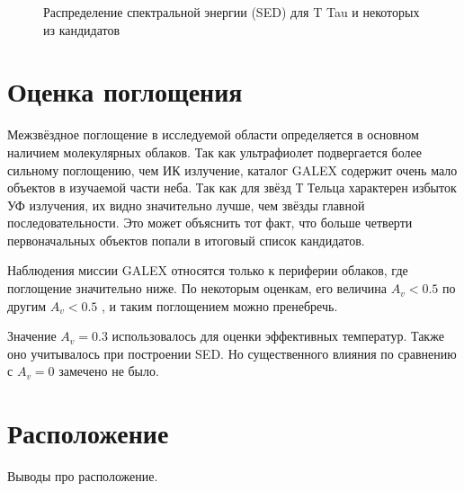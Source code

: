 \begin{figure}[ht]
\begin{minipage}[ht]{0.49\linewidth}
\end{minipage}
\hfill
\begin{minipage}[ht]{0.49\linewidth}
\end{minipage}
\begin{minipage}[ht]{0.49\linewidth}
\end{minipage}
\hfill
\begin{minipage}[ht]{0.49\linewidth}
\end{minipage}
\caption{Распределение спектральной энергии (SED) для T Tau и некоторых из кандидатов}
\label{fig:sed}
\end{figure}

\section{Оценка поглощения}

Межзвёздное поглощение в исследуемой области определяется в основном наличием молекулярных облаков.
Так как ультрафиолет подвергается более сильному поглощению, чем ИК излучение, каталог GALEX содержит очень мало объектов в изучаемой части неба. Так как для звёзд Т Тельца характерен избыток УФ излучения, их видно значительно лучше, чем звёзды главной последовательности. Это может объяснить тот факт, что больше четверти первоначальных объектов попали в итоговый список кандидатов.

Наблюдения миссии GALEX относятся только к периферии облаков, где поглощение значительно ниже. По некоторым оценкам, его величина $A_v < 0.5$ \cite{AIGdC2014galex} по другим $A_v < 0.5$ \cite{park2012far}, и таким поглощением можно пренебречь.

Значение $A_v = 0.3$ использовалось для оценки эффективных температур. Также оно учитывалось при построении SED. Но существенного влияния по сравнению с $A_v = 0$ замечено не было.

\section{Расположение}
Выводы про расположение. 

